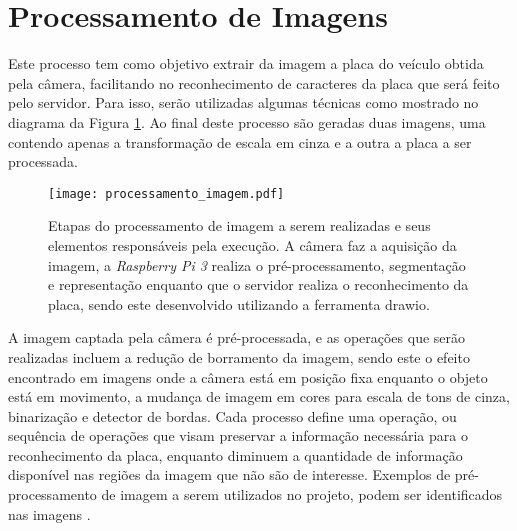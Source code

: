 \section{Processamento de Imagens}
Este processo tem como objetivo extrair da imagem a placa do veículo obtida pela câmera, facilitando no reconhecimento de caracteres da placa que será feito pelo servidor. Para isso, serão utilizadas algumas técnicas como mostrado no diagrama da Figura \ref{processamento_imagem}. Ao final deste processo são geradas duas imagens, uma contendo apenas a transformação de escala em cinza e a outra a placa a ser processada.
\begin{figure}[H]
    \centering
    \texttt{[image: processamento\_imagem.pdf]}
    \caption{Etapas do processamento de imagem a serem realizadas e seus elementos responsáveis pela execução. A câmera faz a aquisição da imagem, a \emph{Raspberry Pi 3} realiza o pré-processamento, segmentação e representação enquanto que o servidor realiza o reconhecimento da placa, sendo este desenvolvido utilizando a ferramenta drawio.} 
    \label{processamento_imagem}
\end{figure}
A imagem captada pela câmera é pré-processada, e as operações que serão realizadas incluem a redução de borramento da imagem, sendo este o efeito encontrado em imagens onde a câmera está em posição fixa enquanto o objeto está em movimento, a mudança de imagem em cores para escala de tons de cinza, binarização e detector de bordas. Cada processo define uma operação, ou sequência de operações que visam preservar a informação necessária para o reconhecimento da placa, enquanto diminuem a quantidade de informação disponível nas regiões da imagem que não são de interesse.
Exemplos de pré-processamento de imagem a serem utilizados no projeto, podem ser identificados nas imagens \cite{gonzalez}.
